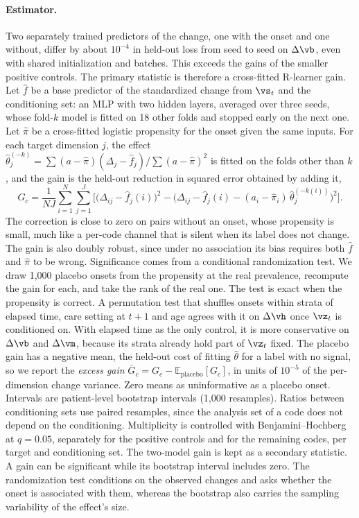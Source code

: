 \paragraph{Estimator.} Two separately trained predictors of the change, one with the onset and one without, differ by about $10^{-4}$ in held-out loss from seed to seed on $\Delta\vb$, even with shared initialization and batches. This exceeds the gains of the smaller positive controls. The primary statistic is therefore a cross-fitted R-learner gain. Let $\hat f$ be a base predictor of the standardized change from $\vs_t$ and the conditioning set: an MLP with two hidden layers, averaged over three seeds, whose fold-$k$ model is fitted on 18 other folds and stopped early on the next one. Let $\hat\pi$ be a cross-fitted logistic propensity for the onset given the same inputs. For each target dimension $j$, the effect $\hat\theta_j^{(-k)}=\sum(a-\hat\pi)(\Delta_j-\hat f_j)\big/\sum(a-\hat\pi)^2$ is fitted on the folds other than $k$, and the gain is the held-out reduction in squared error obtained by adding it,
$$ G_c=\frac{1}{NJ}\sum_{i=1}^{N}\sum_{j=1}^{J}\Big[\big(\Delta_{ij}-\hat f_j(i)\big)^2-\big(\Delta_{ij}-\hat f_j(i)-(a_i-\hat\pi_i)\,\hat\theta_j^{(-k(i))}\big)^2\Big]. $$
The correction is close to zero on pairs without an onset, whose propensity is small, much like a per-code channel that is silent when its label does not change. The gain is also doubly robust, since under no association its bias requires both $\hat f$ and $\hat\pi$ to be wrong. Significance comes from a conditional randomization test. We draw 1{,}000 placebo onsets from the propensity at the real prevalence, recompute the gain for each, and take the rank of the real one. The test is exact when the propensity is correct. A permutation test that shuffles onsets within strata of elapsed time, care setting at $t+1$ and age agrees with it on $\Delta\vh$ once $\vz_t$ is conditioned on. With elapsed time as the only control, it is more conservative on $\Delta\vb$ and $\Delta\vm$, because its strata already hold part of $\vz_t$ fixed. The placebo gain has a negative mean, the held-out cost of fitting $\hat\theta$ for a label with no signal, so we report the \emph{excess gain} $\bar G_c=G_c-\mathbb{E}_{\text{placebo}}[G_c]$, in units of $10^{-5}$ of the per-dimension change variance. Zero means as uninformative as a placebo onset. Intervals are patient-level bootstrap intervals (1{,}000 resamples). Ratios between conditioning sets use paired resamples, since the analysis set of a code does not depend on the conditioning. Multiplicity is controlled with Benjamini--Hochberg at $q=0.05$, separately for the positive controls and for the remaining codes, per target and conditioning set. The two-model gain is kept as a secondary statistic. A gain can be significant while its bootstrap interval includes zero. The randomization test conditions on the observed changes and asks whether the onset is associated with them, whereas the bootstrap also carries the sampling variability of the effect's size.

